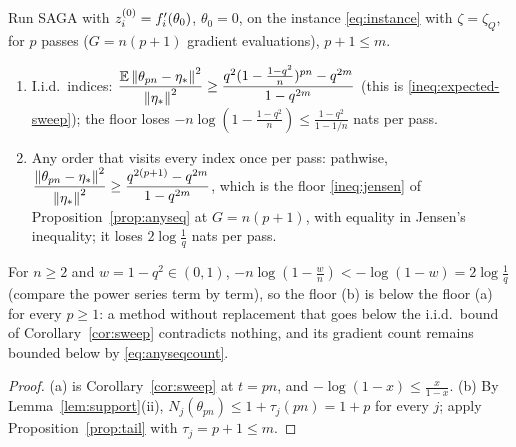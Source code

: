 \begin{proposition}\label{prop:B4-floors}
Run SAGA with $z_i^{(0)}=f'_i(\theta_0)$, $\theta_0=0$, on the instance \eqref{eq:instance} with $\zeta=\zeta_Q$, for $p$ passes ($G=n(p+1)$ gradient evaluations), $p+1\le m$.
\begin{enumerate}[label=(\alph*)]
\item I.i.d.\ indices: $\dfrac{\mathbb{E}\left\|\theta_{pn}-\eta_\ast\right\|^2}{\left\|\eta_\ast\right\|^2}\ge\dfrac{q^2(1-\frac{1-q^2}n)^{pn}-q^{2m}}{1-q^{2m}}$ (this is \eqref{ineq:expected-sweep}); the floor loses $-n\log(1-\frac{1-q^2}n)\le\frac{1-q^2}{1-1/n}$ nats per pass.
\item Any order that visits every index once per pass: pathwise, $\dfrac{\left\|\theta_{pn}-\eta_\ast\right\|^2}{\left\|\eta_\ast\right\|^2}\ge\dfrac{q^{2(p+1)}-q^{2m}}{1-q^{2m}}$, which is the floor \eqref{ineq:jensen} of Proposition~\ref{prop:anyseq} at $G=n(p+1)$, with equality in Jensen's inequality; it loses $2\log\frac1q$ nats per pass.
\end{enumerate}
For $n\ge2$ and $w=1-q^2\in(0,1)$, $-n\log(1-\frac wn)<-\log(1-w)=2\log\frac1q$ (compare the power series term by term), so the floor (b) is below the floor (a) for every $p\ge1$: a method without replacement that goes below the i.i.d.\ bound of Corollary~\ref{cor:sweep} contradicts nothing, and its gradient count remains bounded below by \eqref{eq:anyseqcount}.
\end{proposition}
\begin{proof}
(a) is Corollary~\ref{cor:sweep} at $t=pn$, and $-\log(1-x)\le\frac x{1-x}$. (b) By Lemma~\ref{lem:support}(ii), $N_j(\theta_{pn})\le1+\tau_j(pn)=1+p$ for every $j$; apply Proposition~\ref{prop:tail} with $\tau_j=p+1\le m$.
\end{proof}

